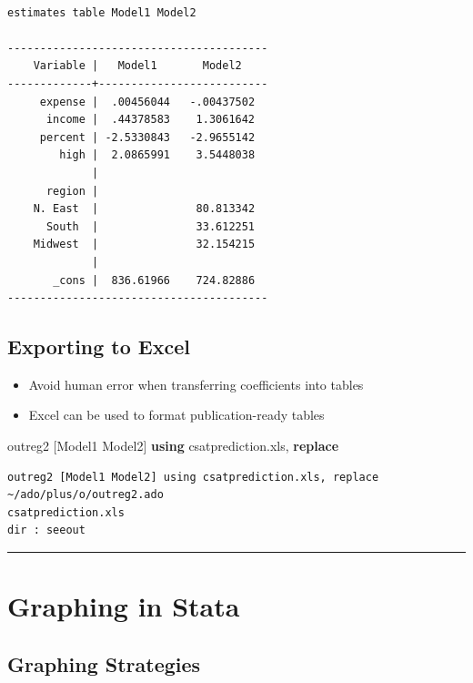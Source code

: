 \documentclass[
]{book}
\newenvironment{Shaded}{\begin{snugshade}}{\end{snugshade}}
\newcommand{\KeywordTok}[1]{\textcolor[rgb]{0.13,0.29,0.53}{\textbf{#1}}}
\newcommand{\NormalTok}[1]{#1}
\providecommand{\tightlist}{%
  \setlength{\itemsep}{0pt}\setlength{\parskip}{0pt}}
\begin{document}
\begin{verbatim}

estimates table Model1 Model2

----------------------------------------
    Variable |   Model1       Model2    
-------------+--------------------------
     expense |  .00456044   -.00437502  
      income |  .44378583    1.3061642  
     percent | -2.5330843   -2.9655142  
        high |  2.0865991    3.5448038  
             |
      region |
    N. East  |               80.813342  
      South  |               33.612251  
    Midwest  |               32.154215  
             |
       _cons |  836.61966    724.82886  
----------------------------------------
\end{verbatim}

\hypertarget{exporting-to-excel}{%
\subsection{Exporting to Excel}\label{exporting-to-excel}}

\begin{itemize}
\tightlist
\item
  Avoid human error when transferring coefficients into tables
\item
  Excel can be used to format publication-ready tables
\end{itemize}

\begin{Shaded}
\begin{Highlighting}[]
\NormalTok{  outreg2 [Model1 Model2] }\KeywordTok{using}\NormalTok{ csatprediction.xls, }\KeywordTok{replace}
\end{Highlighting}
\end{Shaded}

\begin{verbatim}
outreg2 [Model1 Model2] using csatprediction.xls, replace
~/ado/plus/o/outreg2.ado
csatprediction.xls
dir : seeout
\end{verbatim}

\begin{center}\rule{0.5\linewidth}{\linethickness}\end{center}

\hypertarget{graphing-in-stata}{%
\section{Graphing in Stata}\label{graphing-in-stata}}

\hypertarget{graphing-strategies}{%
\subsection{Graphing Strategies}\label{graphing-strategies}}
\end{document}
